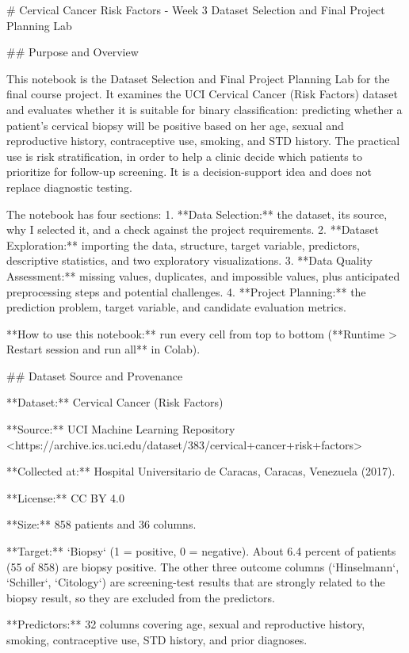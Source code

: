 # Cervical Cancer Risk Factors - Week 3 Dataset Selection and Final Project Planning Lab

## Purpose and Overview

This notebook is the Dataset Selection and Final Project Planning Lab for the final
course project. It examines the UCI Cervical Cancer (Risk Factors) dataset and evaluates
whether it is suitable for binary classification: predicting whether a patient's cervical
biopsy will be positive based on her age, sexual and reproductive history, contraceptive
use, smoking, and STD history. The practical use is risk stratification, in order to help a clinic
decide which patients to prioritize for follow-up screening. It is a decision-support
idea and does not replace diagnostic testing.

The notebook has four sections:
1. **Data Selection:** the dataset, its source, why I selected it, and a check against the
   project requirements.
2. **Dataset Exploration:** importing the data, structure, target variable, predictors,
   descriptive statistics, and two exploratory visualizations.
3. **Data Quality Assessment:** missing values, duplicates, and impossible values, plus
   anticipated preprocessing steps and potential challenges.
4. **Project Planning:** the prediction problem, target variable, and candidate
   evaluation metrics.

**How to use this notebook:** run every cell from top to bottom
(**Runtime > Restart session and run all** in Colab).

## Dataset Source and Provenance

**Dataset:** Cervical Cancer (Risk Factors)

**Source:** UCI Machine Learning Repository
<https://archive.ics.uci.edu/dataset/383/cervical+cancer+risk+factors>

**Collected at:** Hospital Universitario de Caracas, Caracas, Venezuela (2017).

**License:** CC BY 4.0

**Size:** 858 patients and 36 columns.

**Target:** `Biopsy` (1 = positive, 0 = negative). About 6.4 percent of patients (55 of 858) are
biopsy positive. The other three outcome columns (`Hinselmann`, `Schiller`, `Citology`)
are screening-test results that are strongly related to the biopsy result, so they are
excluded from the predictors.

**Predictors:** 32 columns covering age, sexual and reproductive history, smoking,
contraceptive use, STD history, and prior diagnoses.


